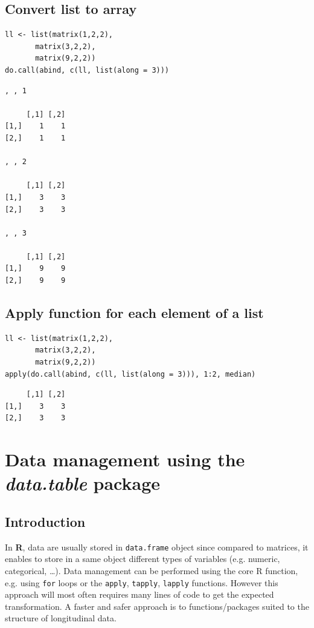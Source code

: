 \documentclass{article}
\newcommand\Rlogo{\textbf{\textsf{R}}\xspace}
\begin{document}
\subsection{Convert list to array}
\label{sec:org747b3a9}

\lstset{language=r,label= ,caption= ,captionpos=b,numbers=none}
\begin{lstlisting}
ll <- list(matrix(1,2,2),
	   matrix(3,2,2),
	   matrix(9,2,2))
do.call(abind, c(ll, list(along = 3)))
\end{lstlisting}

\begin{verbatim}
, , 1

     [,1] [,2]
[1,]    1    1
[2,]    1    1

, , 2

     [,1] [,2]
[1,]    3    3
[2,]    3    3

, , 3

     [,1] [,2]
[1,]    9    9
[2,]    9    9
\end{verbatim}

\subsection{Apply function for each element of a list}
\label{sec:org02b71d4}


\lstset{language=r,label= ,caption= ,captionpos=b,numbers=none}
\begin{lstlisting}
ll <- list(matrix(1,2,2),
	   matrix(3,2,2),
	   matrix(9,2,2))
apply(do.call(abind, c(ll, list(along = 3))), 1:2, median)
\end{lstlisting}

\begin{verbatim}
     [,1] [,2]
[1,]    3    3
[2,]    3    3
\end{verbatim}

\section{Data management using the \emph{data.table} package}
\label{sec:org6ab7bb5}
\subsection{Introduction}
\label{sec:org9af7023}
In \Rlogo, data are usually stored in \texttt{data.frame} object since compared
to matrices, it enables to store in a same object different types of
variables (e.g. numeric, categorical, \ldots{}). Data management can be
performed using the core R function, e.g. using \texttt{for} loops or
the \texttt{apply}, \texttt{tapply}, \texttt{lapply} functions.  However this approach will
most often requires many lines of code to get the expected
transformation.  A faster and safer approach is to functions/packages
suited to the structure of longitudinal data.
\end{document}
